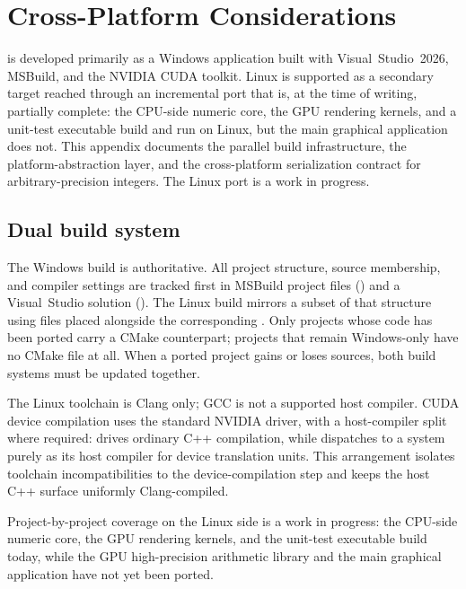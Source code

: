 \section{Cross-Platform Considerations}
\label{sec:cross-platform}

\FractalShark{} is developed primarily as a Windows application built with
Visual~Studio~2026, MSBuild, and the NVIDIA CUDA toolkit.  Linux is supported
as a secondary target reached through an incremental port that is, at the time
of writing, partially complete: the CPU-side numeric core, the GPU rendering
kernels, and a unit-test executable build and run on Linux, but the main
graphical application does not.  This appendix documents the parallel build
infrastructure, the platform-abstraction layer, and the cross-platform
serialization contract for arbitrary-precision integers.  The Linux port is a
work in progress.

\subsection{Dual build system}
\label{subsec:dual-build}

The Windows build is authoritative.  All project structure, source membership,
and compiler settings are tracked first in MSBuild project files
() and a Visual~Studio solution ().  The Linux build
mirrors a subset of that structure using  files placed
alongside the corresponding .  Only projects whose code has been
ported carry a CMake counterpart; projects that remain Windows-only have no
CMake file at all.  When a ported project gains or loses sources, both build
systems must be updated together.

The Linux toolchain is Clang only; GCC is not a supported host compiler.  CUDA
device compilation uses the standard NVIDIA  driver, with a
host-compiler split where required:  drives ordinary C++
compilation, while  dispatches to a system  purely as
its host compiler for device translation units.  This arrangement isolates
toolchain incompatibilities to the device-compilation step and keeps the host
C++ surface uniformly Clang-compiled.

Project-by-project coverage on the Linux side is a work in progress: the
CPU-side numeric core, the GPU rendering kernels, and the unit-test executable
build today, while the GPU high-precision arithmetic library and the main
graphical application have not yet been ported.


